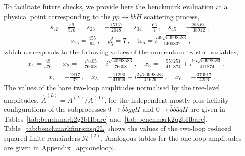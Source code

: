 \documentclass[main.tex]{subfiles}
\begin{document}
To facilitate future checks, we provide here the benchmark evaluation at a physical point corresponding to the $pp \to b\bar{b}H$ scattering process,
\begin{align}
&s_{12}=\frac{49}{576}\,, \quad 
s_{23}=-\frac{15337}{2048}\,, \quad 
s_{34} = \frac{63}{4}\,,\quad  
s_{45} = -\frac{288491}{38912}\,,\nonumber \\[10pt]
& \qquad \quad s_{15} = \frac{455}{64}\,, \quad 
p_5^2 = 7\,, \quad 
\mathrm{tr}_5 = i\frac{49\sqrt{50998583}}{1400832}  \,,
\label{eq:physicalpointHbb}
\end{align}
which corresponds to the following values of the momentum twistor variables,
\begin{align}
&
x_{1}=\frac{49}{576}\,, \quad 
x_{2}=-\frac{77405}{76608}-i\frac{\sqrt{50998583}}{76608}\,, \quad
x_{3}=-\frac{557251}{411874}+i\frac{95\sqrt{50998583}}{411874}\,, \quad \nonumber \\[10pt]
& \qquad \quad
x_{4}=-\frac{2817}{32}\,,\quad 
x_{5}=-\frac{11290}{41629} - i\frac{2\sqrt{50998583}}{41629}\,, \quad 
x_{6}=-\frac{370917}{4256} \,.
\label{eq:physicalpointHbbMomTwistor}
\end{align}
The values of the bare two-loop amplitudes normalised by the tree-level amplitudes,
$\hat{A}^{(L)} = A^{(L)}/A^{(0)}$,
for the independent mostly-plus helicity configurations of the subprocesses $0\to \bar{b} b gg H$ and $0\to \bar{b} b \bar{q} q H$ are given in Tables~\ref{tab:benchmark2g2bHbare} and~\ref{tab:benchmark2q2bHbare}. Table~\ref{tab:benchmarkfinremsq2L} shows the values of the two-loop reduced squared finite remainders $\mathcal{H}^{(2)}$. 
Analogous tables for the one-loop amplitudes are given in Appendix~\ref{app:oneloop}.
\end{document}
